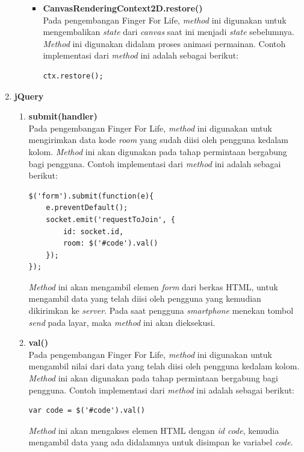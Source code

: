\begin{enumerate}
\begin{enumerate}
\begin{itemize}
			\item \textbf{CanvasRenderingContext2D.restore()} \\
			Pada pengembangan Finger For Life, \textit{method} ini digunakan untuk mengembalikan \textit{state} dari \textit{canvas} saat ini menjadi \textit{state} sebelumnya. \textit{Method} ini digunakan didalam proses animasi permainan. Contoh implementasi dari \textit{method} ini adalah sebagai berikut:
\begin{lstlisting}
ctx.restore();
\end{lstlisting}
		\end{itemize}
	\end{enumerate}
	
	\item \textbf{jQuery} 
	\begin{enumerate}
		\item \textbf{submit(handler)} \\
		Pada pengembangan Finger For Life, \textit{method} ini digunakan untuk mengirimkan data kode \textit{room} yang sudah diisi oleh pengguna kedalam kolom. \textit{Method} ini akan digunakan pada tahap permintaan bergabung bagi pengguna. Contoh implementasi dari \textit{method} ini adalah sebagai berikut:
\begin{lstlisting}
$('form').submit(function(e){
	e.preventDefault();
	socket.emit('requestToJoin', {
		id: socket.id,
		room: $('#code').val()
	});
});
\end{lstlisting}
\textit{Method} ini akan mengambil elemen \textit{form} dari berkas HTML, untuk mengambil data yang telah diisi oleh pengguna yang kemudian dikirimkan ke \textit{server}. Pada saat pengguna \textit{smartphone} menekan tombol \textit{send} pada layar, maka \textit{method} ini akan dieksekusi.
		
		\item \textbf{val()} \\
		Pada pengembangan Finger For Life, \textit{method} ini digunakan untuk mengambil nilai dari data yang telah diisi oleh pengguna kedalam kolom. \textit{Method} ini akan digunakan pada tahap permintaan bergabung bagi pengguna. Contoh implementasi dari \textit{method} ini adalah sebagai berikut:
\begin{lstlisting}
var code = $('#code').val()
\end{lstlisting}
		\textit{Method} ini akan mengakses elemen HTML dengan \textit{id code}, kemudia mengambil data yang ada didalamnya untuk disimpan ke variabel \textit{code}.
		

\end{enumerate}
\end{enumerate}
